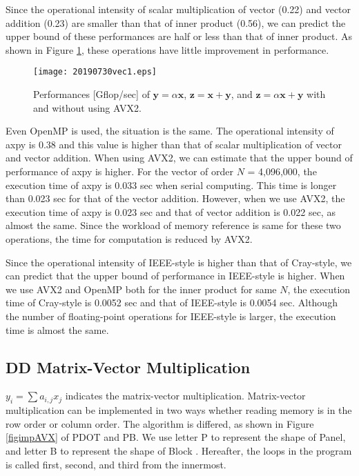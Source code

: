 \documentclass{IOS-Book-Article}
\begin{document}
Since the operational intensity of scalar multiplication of vector (0.22) and vector addition (0.23) are smaller than that of inner product (0.56), we can predict the upper bound of these performances are half or less than that of inner product.
As shown in Figure \ref{xd}, these operations have little improvement in performance. 
\begin{figure}[htbp]
  \begin{center}
    \texttt{[image: 20190730vec1.eps]}
    \caption{Performances [Gflop/sec] of $\bm{y} = \alpha\bm{x}$, $\bm{z} = \bm{x} + \bm{y}$, and $\bm{z} = \alpha\bm{x} + \bm{y}$ with and without using AVX2.}
    \label{xd}
  \end{center}
\end{figure}

Even OpenMP is used, the situation is the same. The operational intensity of axpy is 0.38 and this value is higher than that of scalar multiplication of vector and vector addition. When using AVX2, we can estimate that the upper bound of performance of axpy is higher. For the vector of order $N$ = 4,096,000, the execution time of axpy is 0.033 sec when serial computing. This time is longer than 0.023 sec for that of the vector addition. However, when we use AVX2, the execution time of axpy is 0.023 sec and that of vector addition is 0.022 sec, as almost the same. Since the workload of memory reference is same for these two operations, the time for computation is reduced by AVX2.

Since the operational intensity of IEEE-style is higher than that of Cray-style, we can predict that the upper bound of performance in IEEE-style is higher. When we use AVX2 and OpenMP both for the inner product for same $N$, the execution time of Cray-style is 0.0052 sec and that of IEEE-style is 0.0054 sec. Although the number of floating-point operations for IEEE-style is larger, the execution time is almost the same.

\subsection{DD Matrix-Vector Multiplication}
$y_{i} = \sum a_{i,j}x_{j}$ indicates the matrix-vector multiplication. 
Matrix-vector multiplication can be implemented in two ways whether reading memory is in the row order or column order. The algorithm is differed, as shown in Figure \ref{figimpAVX} of PDOT and PB. We use letter P to represent the shape of Panel, and letter B to represent the shape of Block \cite{goto}. Hereafter, the loops in the program is called first, second, and third from the innermost.
\end{document}
